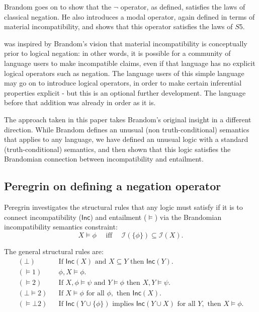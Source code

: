 \NI Brandom goes on to show that the $\neg$ operator, as defined, satisfies
the laws of classical negation.  He also introduces a modal operator,
again defined in terms of material incompatibility, and shows that
this operator satisfies the laws of $S5$.

\Cathoristic{} was inspired by Brandom's vision that material
incompatibility is conceptually prior to logical negation: in other
words, it is possible for a community of language users to make incompatible claims, even if that
language has no explicit logical operators such as negation.  The
language users of this simple language may go on to introduce logical
operators, in order to make certain inferential properties explicit -
but this is an optional further development.  The language before that
addition was already in order as it is.

The approach taken in this paper takes Brandom's original insight in a
different direction.  While Brandom defines an unusual (non
truth-conditional) semantics that applies to any language, we have
defined an unusual logic with a standard (truth-conditional) semantics, and then shown that this logic satisfies the Brandomian connection between incompatibility and entailment.

\subsection{Peregrin on defining a negation operator}\label{peregrin}

Peregrin \cite{PeregrinJ:logbasoi} investigates the  structural
rules that any logic must satisfy if it is to connect incompatibility
($\mathsf{Inc}$) and entailment ($\models$) via the Brandomian
incompatibility semantics constraint:
\[
X \models \phi \quad\text{ iff }\quad \mathcal{I}(\{\phi\}) \subseteq \mathcal{I}(X).
\]

\NI The general structural rules are:
\begin{eqnarray*}
  (\bot) & & \text{If } \mathsf{Inc}(X) \text{ and } X \subseteq Y \text{ then } \mathsf{Inc}(Y). \\
  (\models 1) & & \phi, X \models \phi. \\
  (\models 2) & & \text{If }X, \phi \models \psi \text{ and } Y \models \phi \text{ then } X, Y \models \psi. \\
  (\bot \models 2) & & \text{If } X \models \phi \text{ for all } \phi, \text{ then } \mathsf{Inc}(X). \\
  (\models \bot 2) & & \text{If } \mathsf{Inc}(Y \cup \{\phi\}) \text{ implies } \mathsf{Inc}(Y \cup X) \text{ for all } Y, \text{ then } X \models \phi.
\end{eqnarray*}


